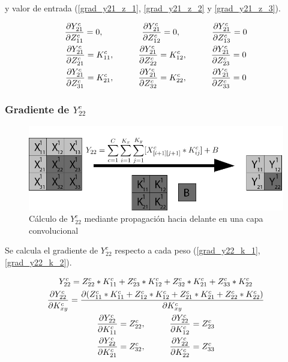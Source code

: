  y valor de entrada (\ref{grad_y21_z_1}, \ref{grad_y21_z_2} y \ref{grad_y21_z_3}).
 
\begin{gather}
	\frac{\partial Y^c_{21}}{\partial Z^c_{11}} = 0, \hspace{16mm} \frac{\partial Y^c_{21}}{\partial Z^c_{12}} = 0, \hspace{13mm} \frac{\partial Y^c_{21}}{\partial Z^c_{13}} = 0 \label{grad_y21_z_1} \\
	\frac{\partial Y^c_{21}}{\partial Z^c_{21}} = K^c_{11}, \hspace{10mm} \frac{\partial Y^c_{21}}{\partial Z^c_{22}} = K^c_{12}, \hspace{10mm} \frac{\partial Y^c_{21}}{\partial Z^c_{23}} = 0 \label{grad_y21_z_2} \\
	\frac{\partial Y^c_{21}}{\partial Z^c_{31}} = K^c_{21}, \hspace{10mm} \frac{\partial Y^c_{21}}{\partial Z^c_{32}} = K^c_{22}, \hspace{10mm} \frac{\partial Y^c_{21}}{\partial Z^c_{33}} = 0 \label{grad_y21_z_3}
\end{gather}


\subsubsection{Gradiente de $Y^c_{22}$}

\begin{figure}[H]
	\centering
	\includegraphics[width=1\linewidth]{imagenes/conv_ejemplo_backprop_4.jpg} 
	\caption{Cálculo de $Y^c_{22}$ mediante propagación hacia delante en una capa convolucional}
	\label{fig:ejemplo_4_forward_prop_convolucional}
\end{figure}

Se calcula el gradiente de $Y^c_{22}$ respecto a cada peso (\ref{grad_y22_k_1}, \ref{grad_y22_k_2}).

\begin{gather}
	Y^c_{22} = Z^c_{22} * K^c_{11} + Z^c_{23} * K^c_{12} + Z^c_{32} * K^c_{21} + Z^c_{33} * K^c_{22} \\
	\frac{\partial Y^c_{22}}{\partial K^c_{xy}} = \frac{\partial (Z^c_{11} * K^c_{11} + Z^c_{12} * K^c_{12} + Z^c_{21} * K^c_{21} + Z^c_{22} * K^c_{22})}{\partial K^c_{xy}} \\
	\frac{\partial Y^c_{22}}{\partial K^c_{11}} = Z^c_{22}, \hspace{10mm} \frac{\partial Y^c_{22}}{\partial K^c_{12}} = Z^c_{23} \label{grad_y22_k_1} \\
	\frac{\partial Y^c_{22}}{\partial K^c_{21}} = Z^c_{32}, \hspace{10mm} \frac{\partial Y^c_{22}}{\partial K^c_{22}} = Z^c_{33} \label{grad_y22_k_2}
\end{gather}

